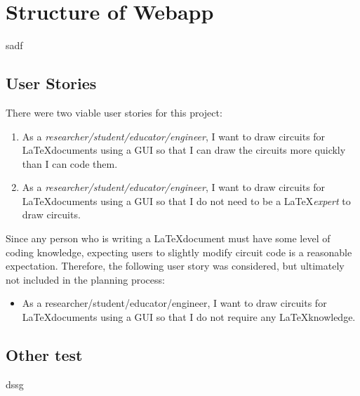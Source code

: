 %
\chapter{Structure of Webapp}\label{ch:structure}
sadf

\section{User Stories}\label{sec:user-stories}
There were two viable user stories for this project:
\begin{enumerate}
    \item As a \emph{researcher/student/educator/engineer}, I want to draw circuits for \LaTeX documents using a GUI so that I can draw the circuits more quickly than I can code them.
    \item As a \emph{researcher/student/educator/engineer}, I want to draw circuits for \LaTeX documents using a GUI so that I do not need to be a \LaTeX \emph{expert} to draw circuits.
\end{enumerate}

Since any person who is writing a \LaTeX document must have some level of coding knowledge, expecting users to slightly modify circuit code is a reasonable expectation.
Therefore, the following user story was considered, but ultimately not included in the planning process:
\begin{itemize}
    \item {\color{red}As a researcher/student/educator/engineer, I want to draw circuits for \LaTeX documents using a GUI so that I do not require any \LaTeX knowledge.}
\end{itemize}

\section{Other test}
dssg